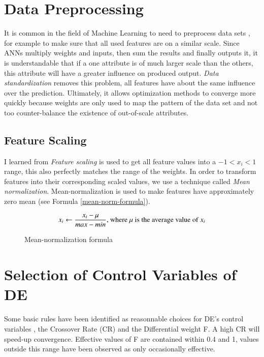 \documentclass[a4paper,12pt, oneside]{memoir}
\begin{document}
\section{Data Preprocessing}

It is common in the field of Machine Learning to need to preprocess data sets \cite{coursera-machine-learning-stanford}, for example to make sure that all used features are on a similar scale. Since ANNs multiply weights and inputs, then sum the results and finally outputs it, it is understandable that if a one attribute is of much larger scale than the others, this attribute will have a greater influence on produced output. \textit{Data standardization} removes this problem, all features have about the same influence over the prediction. Ultimately, it allows optimization methods to converge more quickly because weights are only used to map the pattern of the data set and not too counter-balance the existence of out-of-scale attributes.

\subsection{Feature Scaling}
I learned from \cite{coursera-machine-learning-stanford} \textit{Feature scaling} is used to get all feature values into a $-1< x_i < 1$ range, this also perfectly matches the range of the weights. In order to transform features into their corresponding scaled values, we use a technique called \textit{Mean normalization}. Mean-normalization is used to make features have approximately zero mean (see Formula \eqref{mean-norm-formula}).

\begin{figure}[h]
  \begin{equation}
  x_i \gets {x_i -\mu \over max - min} \text{, where $\mu$ is the average value of $x_{i}$}
  \end{equation}
  \caption{Mean-normalization formula}
  \label{mean-norm-formula}
\end{figure}

\section{Selection of Control Variables of DE}

Some basic rules have been identified as reasonnable choices for DE's control variables \cite{storn-1997}, the Crossover Rate (CR) and the Differential weight F. A high CR will speed-up convergence. Effective values of F are contained within 0.4 and 1, values outside this range have been observed as only occasionally effective.
\end{document}
